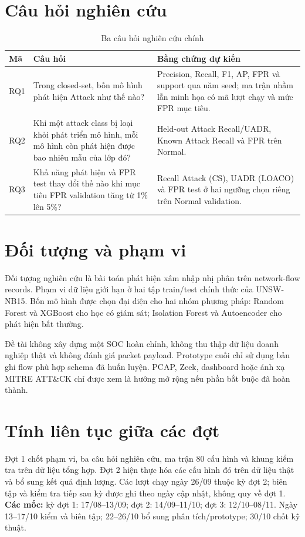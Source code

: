 \documentclass[12pt,a4paper,oneside]{report}
\begin{document}
\section{Câu hỏi nghiên cứu}

\begin{table}[H]
\centering
\caption{Ba câu hỏi nghiên cứu chính}
\label{tab:rq}
\begin{tabularx}{\textwidth}{L{1.3cm}Y Y}
\toprule
\textbf{Mã} & \textbf{Câu hỏi} & \textbf{Bằng chứng dự kiến} \\
\midrule
RQ1 & Trong closed-set, bốn mô hình phát hiện Attack như thế nào? & Precision, Recall, F1, AP, FPR và support qua năm seed; ma trận nhầm lẫn minh họa có mã lượt chạy và mức FPR mục tiêu. \\
RQ2 & Khi một attack class bị loại khỏi phát triển mô hình, mỗi mô hình còn phát hiện được bao nhiêu mẫu của lớp đó? & Held-out Attack Recall/UADR, Known Attack Recall và FPR trên Normal. \\
RQ3 & Khả năng phát hiện và FPR test thay đổi thế nào khi mục tiêu FPR validation tăng từ 1\% lên 5\%? & Recall Attack (CS), UADR (LOACO) và FPR test ở hai ngưỡng chọn riêng trên Normal validation. \\
\bottomrule
\end{tabularx}
\end{table}

\section{Đối tượng và phạm vi}

Đối tượng nghiên cứu là bài toán phát hiện xâm nhập nhị phân trên network-flow records. Phạm vi dữ liệu giới hạn ở hai tập train/test chính thức của UNSW-NB15. Bốn mô hình được chọn đại diện cho hai nhóm phương pháp: Random Forest và XGBoost cho học có giám sát; Isolation Forest và Autoencoder cho phát hiện bất thường.

Đề tài không xây dựng một SOC hoàn chỉnh, không thu thập dữ liệu doanh nghiệp thật và không đánh giá packet payload. Prototype cuối chỉ sử dụng bản ghi flow phù hợp schema đã huấn luyện. PCAP, Zeek, dashboard hoặc ánh xạ MITRE ATT\&CK chỉ được xem là hướng mở rộng nếu phần bắt buộc đã hoàn thành.


\section{Tính liên tục giữa các đợt}
Đợt 1 chốt phạm vi, ba câu hỏi nghiên cứu, ma trận 80 cấu hình và khung kiểm tra trên dữ liệu tổng hợp. Đợt 2 hiện thực hóa các cấu hình đó trên dữ liệu thật và bổ sung kết quả định lượng. Các lượt chạy ngày 26/09 thuộc kỳ đợt 2; biên tập và kiểm tra tiếp sau kỳ được ghi theo ngày cập nhật, không quy về đợt 1.
\noindent\textbf{Các mốc:} kỳ đợt 1: 17/08--13/09; đợt 2: 14/09--11/10; đợt 3: 12/10--08/11. Ngày 13--17/10 kiểm và biên tập; 22--26/10 bổ sung phân tích/prototype; 30/10 chốt kỹ thuật.
\end{document}
